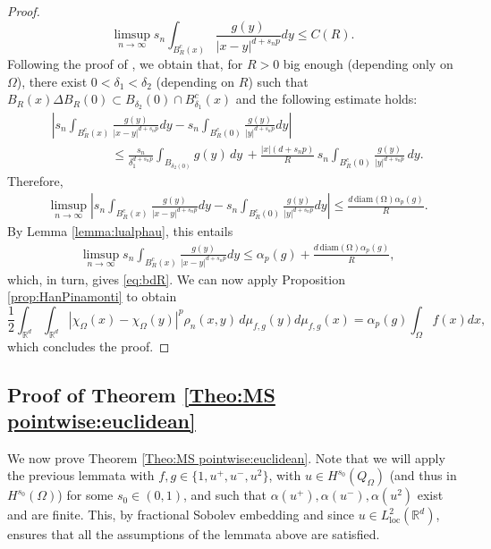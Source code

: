 \documentclass[reqno,11pt]{amsart}
\numberwithin{equation}{section}
\theoremstyle{definition} %
\theoremstyle{plain}
\theoremstyle{definition}
\theoremstyle{remark}
\def\elle#1{L^{#1}}
\def\Qom{{Q_\Omega}}
\def\O{\Omega}
\def\R{\mathbb{R}}
\def\Rd{\mathbb{R}^d}
\newcommand{\abs}[1]{\left|#1\right|}
\begin{document}
\begin{proof}
\begin{equation}
\label{eq:bdR}
    \limsup_{n\to \infty}s_n\int_{B_R^c(x)}\frac{g(y)}{\abs{x-y}^{d+s_np}}dy\leq C(R).
\end{equation}
Following the proof of , we obtain that, for $R>0$ big enough (depending only on $\O$), there exist $0<\delta_1<\delta _2$ (depending on $R$) such that $B_R(x)\Delta B_R(0)\subset B_{\delta_2}(0)\cap B_{\delta_1}^c(x)$ and 
the following estimate holds:
\begin{equation*}
    \begin{split}
        & \abs{  s_n\int_{B_R^c(x)}\frac{g(y)}{\abs{x-y}^{d+s_np}}dy-   s_n\int_{B_R^c(0)}\frac{g(y)}{\abs{y}^{d+s_np}}dy}\\
        &\hspace{2cm}\leq  \frac{s_n}{\delta_1^{d+s_np}}\int_{B_{\delta_2(0)}}g(y)\,dy\, +  \frac{\abs{x}(d+s_np)}{R}\,s_n\int_{B_R^c(0)}\frac{g(y)}{\abs{y}^{d+s_np}}\,dy.
  \end{split}
\end{equation*}    
Therefore,
\begin{equation*}
    \begin{split}
        &\limsup_{n\to \infty} \abs{  s_n\int_{B_R^c(x)}\frac{g(y)}{\abs{x-y}^{d+s_np}}dy-   s_n\int_{B_R^c(0)}\frac{g(y)}{\abs{y}^{d+s_np}}dy} \leq \frac{d\,\mathrm{diam(\O)}\alpha_p(g)}{R}.
  \end{split}
\end{equation*} 
By Lemma \ref{lemma:lualphau}, this entails
\begin{equation*}
    \begin{split}
        &\limsup_{n\to \infty}s_n\int_{B_R^c(x)}\frac{g(y)}{\abs{x-y}^{d+s_np}}dy\leq   \alpha_p(g)+ \frac{d\,\mathrm{diam(\O)}\alpha_p(g)}{R},
  \end{split}
\end{equation*} 
which, in turn, gives \eqref{eq:bdR}. We can now apply Proposition \ref{prop:HanPinamonti} to obtain
\begin{equation*}
    \frac{1}{2}\int_{\R^d}\int_{\R^d}\abs{\chi_{\Omega}(x)-\chi_{\Omega}(y)}^p\rho_n(x,y)\,d\mu_{f,g}(y)d\mu_{f,g}(x)=\alpha_p(g)\int_{\O}f(x)dx,
\end{equation*}
which concludes the proof.
\end{proof}

\subsection{Proof of Theorem \ref{Theo:MS pointwise:euclidean}}
We now prove Theorem \ref{Theo:MS pointwise:euclidean}. Note that we will apply the previous lemmata with $f,g\in\{1,u^+,u^-,u^2\}$, with $u\in H^{s_0}(\Qom)$ (and thus in $H^{s_0}(\O)$) for some $s_0\in(0,1)$, and such that $\alpha(u^+),\alpha(u^-),\alpha(u^2)$ exist and are finite. 
This, by fractional Sobolev embedding and since $u\in\elle2_\text{loc}(\Rd)$, ensures that all the assumptions of the lemmata above are satisfied.
\end{document}
